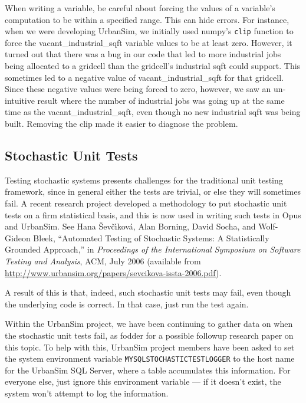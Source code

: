 When writing a variable, be careful about forcing the values of a variable's
computation to be within a specified range.  This can hide
errors.  For instance, when we were developing UrbanSim, we initially used
numpy's \verb|clip| function to force the
vacant_industrial_sqft variable values to be at least zero.
However, it turned out that there was a bug in our code that led to more
industrial jobs being allocated to a gridcell than the gridcell's industrial
sqft could support.  This sometimes led to a negative value of
vacant_industrial_sqft for that gridcell.  Since these negative values were
being forced to zero, however, we saw an un-intuitive result where the number
of industrial jobs was going up at the same time as the vacant_industrial_sqft,
even though no new industrial sqft was being built. Removing the clip made it
easier to diagnose the problem.

\subsection{Stochastic Unit Tests}

 
Testing stochastic systems presents challenges for the traditional unit
testing framework, since in general either the tests are trivial, or else
they will sometimes fail.  A recent research project developed a
methodology to put stochastic unit tests on a firm statistical basis, and
this is now used in writing such tests in Opus and UrbanSim.  See
Hana {\v{S}}ev\v{c}\'{\i}kov\'{a}, Alan Borning, David Socha, and
Wolf-Gideon Bleek, ``Automated Testing of Stochastic Systems: A
Statistically Grounded Approach,'' in \emph{Proceedings of the
International Symposium on Software Testing and Analysis}, ACM,
July 2006 (available from
\url{http://www.urbansim.org/papers/sevcikova-issta-2006.pdf}).

A result of this is that, indeed, such stochastic unit tests may fail, even
though the underlying code is correct.  In that case, just run the test
again.

Within the UrbanSim project, we have been continuing to gather data on when
the stochastic unit tests fail, as fodder for a possible followup research
paper on this topic.  To help with this, UrbanSim project members have been
asked to set the system environment variable
\verb|MYSQLSTOCHASTICTESTLOGGER| to the
host name for the UrbanSim SQL Server, where a table accumulates this
information.  For everyone else, just ignore this environment variable ---
if it doesn't exist, the system won't attempt to log the information.

